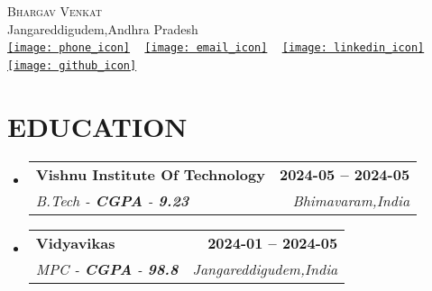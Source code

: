 \documentclass[letterpaper,11pt]{article}
\makeatletter
\newcommand{\resumeSubheading}[4]{
        \vspace{-2pt}\item
          \begin{tabular*}{1.0\textwidth}[t]{l@{\extracolsep{\fill}}r}
            \textbf{\large#1} & \textbf{\small #2} \\
            \textit{\large#3} & \textit{\small #4} \\
            
          \end{tabular*}\vspace{-7pt}
      }
\newcommand{\resumeSubHeadingListStart}{\begin{itemize}[leftmargin=0.0in, label={}]}
\newcommand{\resumeSubHeadingListEnd}{\end{itemize}}
\makeatother
\begin{document}
      
    
        \begin{center}
            {\Huge \scshape Bhargav Venkat} \\ \vspace{1pt}
            Jangareddigudem,Andhra Pradesh \\ \vspace{1pt}
            \small 
            \href{tel:+8179327201}{\texttt{[image: phone\_icon]}}\hspace{0.2em} ~
            \href{mailto:bhargavvenkat515@gmail.com}{\texttt{[image: email\_icon]}}\hspace{0.2em} ~ 
            \href{https://www.linkedin.com/in/bhargav-venkat-polireddy-77153221b/}{\texttt{[image: linkedin\_icon]}}\hspace{0.2em} ~
\href{https://github.com/BhargavAlpha}{\texttt{[image: github\_icon]}}\hspace{0.2em} ~
 ~
 ~

            \vspace{-8pt}
        \end{center}
    
        \section{EDUCATION}
        \resumeSubHeadingListStart
          
              \resumeSubheading
                {Vishnu Institute Of Technology}{2024-05 -- 2024-05}
                {B.Tech - \textbf{CGPA} - \textbf{9.23}} {Bhimavaram,India}
            
              \resumeSubheading
                {Vidyavikas}{2024-01 -- 2024-05}
                {MPC - \textbf{CGPA} - \textbf{98.8}} {Jangareddigudem,India}
            
        \resumeSubHeadingListEnd
    
\end{document}
